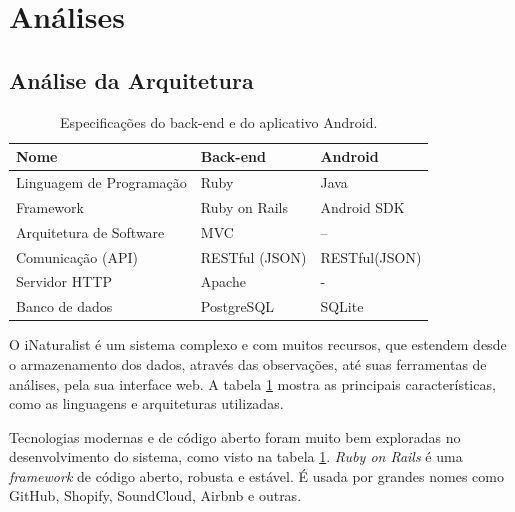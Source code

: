 \section{Análises}
\subsection{Análise da Arquitetura}
\label{sec:arquitetura}

\begin{table}[h!]
  \centering
  \begin{tabular}{lll}
    \toprule
    \textbf{Nome}                  & \textbf{Back-end} & \textbf{Android} \\
    \midrule
    Linguagem de Programação       & Ruby              & Java             \\
    Framework                      & Ruby on Rails     & Android SDK      \\
    Arquitetura de Software        & MVC               & --               \\
    Comunicação (API)\footnotemark & RESTful (JSON)    & RESTful(JSON)    \\
    Servidor HTTP                  & Apache            & -                \\
    Banco de dados                 & PostgreSQL        & SQLite           \\
    \bottomrule
  \end{tabular}

  \caption{Especificações do back-end e do aplicativo Android.}
  \label{tab:back-end-espec}
\end{table}


O iNaturalist é um sistema complexo e com muitos recursos, que estendem desde o armazenamento dos dados, através das observações, até suas ferramentas de análises, pela sua interface web. A tabela \ref{tab:back-end-espec} mostra as principais características, como as linguagens e arquiteturas utilizadas.

Tecnologias modernas e de código aberto foram muito bem exploradas no desenvolvimento do sistema, como visto na tabela \ref{tab:back-end-espec}. \emph{Ruby on Rails} é uma \emph{framework} de código aberto, robusta e estável. É usada por grandes nomes como GitHub, Shopify, SoundCloud, Airbnb e outras.

